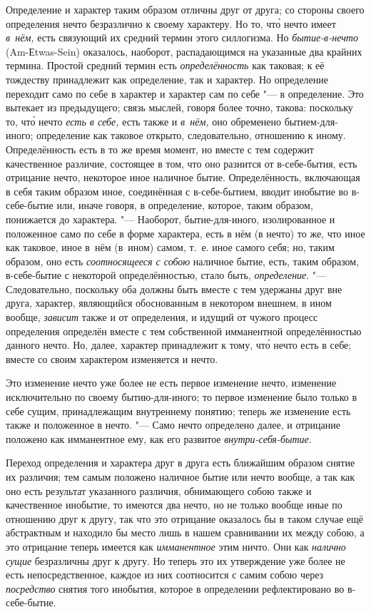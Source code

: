 Определение и характер таким образом отличны друг от друга; со стороны
своего определения нечто безразлично к своему характеру. Но то, чт\'{о} нечто
имеет {\em в~нём,} есть связующий их средний термин
этого силлогизма. Но {\em бытие-в-нечто}
(Am-Еtwas-Sein) оказалось, наоборот, распадающимся на указанные два крайних
термина. Простой средний термин есть
{\em определённость} как таковая; к её тождеству
принадлежит как определение, так и характер. Но определение переходит само
по себе в характер и характер сам по себе "--- в определение. Это вытекает из
предыдущего; связь мыслей, говоря более точно, такова: поскольку то, чт\'{о}
нечто {\em есть в себе,} есть также и
{\em в~нём,} оно обременено бытием-для-иного;
определение как таковое открыто, следовательно, отношению к иному.
Определённость есть в то же время момент, но вместе с тем содержит
качественное различие, состоящее в том, что оно разнится от в-себе-бытия,
есть отрицание нечто, некоторое иное наличное бытие. Определённость,
включающая в себя таким образом иное, соединённая с в-себе-бытием, вводит
инобытие во в-себе-бытие или, иначе говоря, в определение, которое, таким
образом, понижается до характера. "--- Наоборот, бытие-для-иного,
изолированное и положенное само по себе в форме характера, есть в нём (в
нечто) то же, что иное как таковое, иное в~нём (в~ином) самом, т.~е.
иное самого себя; но, таким образом, оно есть
{\em соотносящееся с собою} наличное бытие, есть, таким
образом, в-себе-бытие с некоторой определённостью, стало быть,
{\em определение}. "--- Следовательно, поскольку оба
должны быть вместе с тем удержаны друг вне друга, характер, являющийся
обоснованным в некотором внешнем, в ином вообще,
{\em зависит} также и от определения, и идущий от
чужого процесс определения определён вместе с тем собственной имманентной
определённостью данного нечто. Но, далее, характер принадлежит к тому, чт\'{о}
нечто есть в себе; вместе со своим характером изменяется и нечто.

Это изменение нечто уже более не есть первое изменение нечто, изменение
исключительно по своему бытию-для-иного; то первое изменение было только
в себе сущим, принадлежащим внутреннему понятию; теперь же изменение есть
также и положенное в нечто. "--- Само нечто определено далее, и отрицание
положено как имманентное ему, как его развитое
{\em внутри-себя-бытие}.

Переход определения и характера друг в друга есть ближайшим образом снятие
их различия; тем самым положено наличное бытие или нечто вообще, а так как
оно есть результат указанного различия, обнимающего собою также и
качественное инобытие, то имеются два нечто, но не только вообще иные по
отношению друг к другу, так что это отрицание оказалось бы в таком случае
ещё абстрактным и находило бы место лишь в нашем сравнивании их между
собою, а это отрицание теперь имеется как
{\em имманентное} этим ничто. Они как
{\em налично сущие} безразличны друг к другу. Но теперь
это их утверждение уже более не есть непосредственное, каждое из них
соотносится с самим собою через {\em посредство} снятия
того инобытия, которое в определении рефлектировано во в-себе-бытие.

